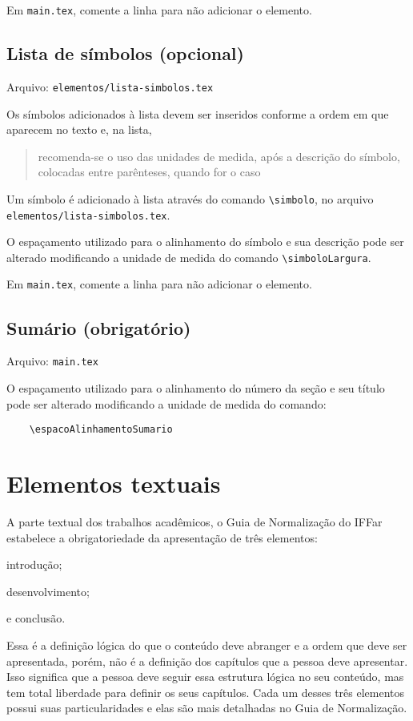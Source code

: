     Em \texttt{main.tex}, comente a linha \verb|| para não adicionar o elemento.

\subsection{Lista de símbolos (opcional)}
    Arquivo: \texttt{elementos/lista-simbolos.tex}

    Os símbolos adicionados à lista devem ser inseridos conforme a ordem em que aparecem no texto e, na lista, \blockcquote[p. 32]{livro:iffar-guia-normalizacao-2022}{recomenda-se o uso das unidades de medida, após a descrição do símbolo, colocadas entre parênteses, quando for o caso}. Um símbolo é adicionado à lista através do comando \verb|\simbolo|, no arquivo \texttt{elementos/lista-simbolos.tex}.

    O espaçamento utilizado para o alinhamento do símbolo e sua descrição pode ser alterado modificando a unidade de medida do comando \verb|\simboloLargura|.

    Em \texttt{main.tex}, comente a linha \verb|| para não adicionar o elemento.
    
\subsection{Sumário (obrigatório)}
    Arquivo: \texttt{main.tex}

    O espaçamento utilizado para o alinhamento do número da seção e seu título pode ser alterado modificando a unidade de medida do comando:
\begin{verbatim}
    \espacoAlinhamentoSumario
\end{verbatim}
    

\section{Elementos textuais}
    A parte textual dos trabalhos acadêmicos, o Guia de Normalização do IFFar estabelece a obrigatoriedade da apresentação de três elementos:
        \begin{alinea}
            \item introdução;
            \item desenvolvimento;
            \item e conclusão.
        \end{alinea}
    Essa é a definição lógica do que o conteúdo deve abranger e a ordem que deve ser apresentada, porém, não é a definição dos capítulos que a pessoa deve apresentar. Isso significa que a pessoa deve seguir essa estrutura lógica no seu conteúdo, mas tem total liberdade para definir os seus capítulos. Cada um desses três elementos possui suas particularidades e elas são mais detalhadas no Guia de Normalização.

